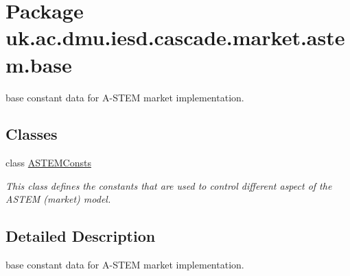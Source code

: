 \hypertarget{namespaceuk_1_1ac_1_1dmu_1_1iesd_1_1cascade_1_1market_1_1astem_1_1base}{\section{Package uk.\-ac.\-dmu.\-iesd.\-cascade.\-market.\-astem.\-base}
\label{namespaceuk_1_1ac_1_1dmu_1_1iesd_1_1cascade_1_1market_1_1astem_1_1base}
}


base constant data for A-\/\-S\-T\-E\-M market implementation.  


\subsection*{Classes}
\begin{DoxyCompactItemize}
\item 
class \hyperlink{classuk_1_1ac_1_1dmu_1_1iesd_1_1cascade_1_1market_1_1astem_1_1base_1_1_a_s_t_e_m_consts}{A\-S\-T\-E\-M\-Consts}
\begin{DoxyCompactList}\small\item\em This class defines the constants that are used to control different aspect of the A\-S\-T\-E\-M (market) model. \end{DoxyCompactList}\end{DoxyCompactItemize}


\subsection{Detailed Description}
base constant data for A-\/\-S\-T\-E\-M market implementation. 